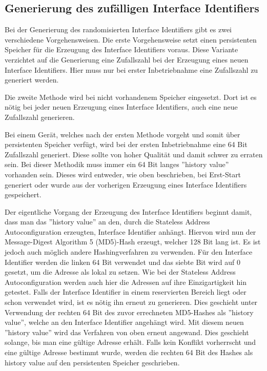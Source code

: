 \documentclass[a4paper, 12pt]{scrartcl}
\begin{document}
\subsection{Generierung des zufälligen Interface Identifiers}
Bei der Generierung des randomisierten Interface Identifiers gibt es zwei verschiedene Vorgehensweisen.
Die erste Vorgehensweise setzt einen persistenten Speicher für die Erzeugung des Interface Identifiers voraus.
Diese Variante verzichtet auf die Generierung eine Zufallszahl bei der Erzeugung eines neuen Interface Identifiers.
Hier muss nur bei erster Inbetriebnahme eine Zufallszahl zu generiert werden.

Die zweite Methode wird bei nicht vorhandenem Speicher eingesetzt. Dort ist es nötig bei jeder neuen Erzeugung eines Interface Identifiers, auch eine neue Zufallszahl generieren.

Bei einem Gerät, welches nach der ersten Methode vorgeht und somit über persistenten Speicher verfügt, wird bei der ersten Inbetriebnahme eine 64 Bit Zufallszahl generiert. 
Diese sollte von hoher Qualität und damit schwer zu erraten sein. 
Bei dieser Methodik muss immer ein 64 Bit langes ''history value'' vorhanden sein. Dieses wird entweder, wie oben beschrieben, bei Erst-Start generiert oder wurde aus der vorherigen Erzeugung eines Interface Identifiers gespeichert.

Der eigentliche Vorgang der Erzeugung des Interface Identifiers beginnt damit, dass man das ''history value'' an den, durch die Stateless Address Autoconfiguration erzeugten, Interface Identifier anhängt.
Hiervon wird nun der Message-Digest Algorithm 5 (MD5)-Hash erzeugt, welcher 128 Bit lang ist.
Es ist jedoch auch möglich andere Hashingverfahren zu verwenden.
Für den Interface Identifier werden die linken 64 Bit verwendet und das siebte Bit wird auf 0 gesetzt, um die Adresse als lokal zu setzen.
Wie bei der Stateless Address Autoconfiguration werden auch hier die Adressen auf ihre Einzigartigkeit hin getestet.
Falls der Interface Identifier in einem reservierten Bereich liegt oder schon verwendet wird, ist es nötig ihn erneut zu generieren.
Dies geschieht unter Verwendung der rechten 64 Bit des zuvor errechneten MD5-Hashes als ''history value'', welche an den Interface Identifier angehängt wird.
Mit diesem neuen ''history value'' wird das Verfahren von oben erneut angewand. Dies geschieht solange, bis man eine gültige Adresse erhält.
Falls kein Konflikt vorherrscht und eine gültige Adresse bestimmt wurde, werden die rechten 64 Bit des Hashes als history value auf den persistenten Speicher geschrieben.
\end{document}
